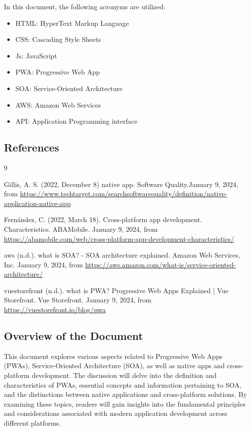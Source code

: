 \documentclass[12pt,a4paper, twosite]{article}
\begin{document}
In this document, the following  acronyms are utilized:
\begin{itemize}
\item HTML: HyperText Markup Language
\item CSS: Cascading Style Sheets
\item Js: JavaScript
\item PWA: Progressive Web App
\item SOA: Service-Oriented Architecture
\item AWS: Amazon Web Services
\item API: Application Programming interface
\end{itemize}

\subsection{References}
\label{sec:org62711e0}

\begin{thebibliography}
{9}

 Gillis, A. S. (2022, December 8)  native app. Software Quality.January 9, 2024, from \url{https://www.techtarget.com/searchsoftwarequality/definition/native-application-native-app}

 Fernández, C. (2022, March 18). Cross-platform app development. Characteristics. ABAMobile. January 9, 2024, from \url{https://abamobile.com/web/cross-platform-app-development-characteristics/}

 aws (n.d.). what is SOA? - SOA architecture explained. Amazon Web Services, Inc. January 9, 2024, from \url{https://aws.amazon.com/what-is/service-oriented-architecture/}

 vuestorefront (n.d.). what is PWA? Progressive Web Apps Explained | Vue Storefront. Vue Storefront. January 9, 2024, from \url{https://vuestorefront.io/blog/pwa}

\end{thebibliography}


\subsection{Overview of the Document}
\label{sec:orgdaca22c}

This document explores various aspects related to Progressive Web Apps (PWAs), Service-Oriented Architecture (SOA), as well as native apps and cross-platform development. The discussion will delve into the definition and characteristics of PWAs, essential concepts and information pertaining to SOA, and the distinctions between native applications and cross-platform solutions. By examining these topics, readers will gain insights into the fundamental principles and considerations associated with modern application development across different platforms.
\end{document}

